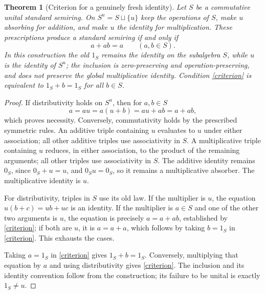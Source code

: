 \documentclass[11pt]{article}
\newtheorem{theorem}{Theorem}
\begin{document}
\begin{theorem}[Criterion for a genuinely fresh identity]
Let $S$ be a commutative unital standard semiring. On $S^u=S\sqcup\{u\}$ keep the operations of $S$, make $u$ absorbing for addition, and make $u$ the identity for multiplication. These prescriptions produce a standard semiring if and only if
\begin{equation}\label{criterion}
a+ab=a\qquad(a,b\in S).
\end{equation}
In this construction the old $1_S$ remains the identity on the subalgebra $S$, while $u$ is the identity of $S^u$; the inclusion is zero-preserving and operation-preserving, and does not preserve the global multiplicative identity. Condition \eqref{criterion} is equivalent to $1_S+b=1_S$ for all $b\in S$.
\end{theorem}
\begin{proof}
If distributivity holds on $S^u$, then for $a,b\in S$
\[
a=a u=a(u+b)=a u+ab=a+ab,
\]
which proves necessity. Conversely, commutativity holds by the prescribed symmetric rules. An additive triple containing $u$ evaluates to $u$ under either association; all other additive triples use associativity in $S$. A multiplicative triple containing $u$ reduces, in either association, to the product of the remaining arguments; all other triples use associativity in $S$. The additive identity remains $0_S$, since $0_S+u=u$, and $0_Su=0_S$, so it remains a multiplicative absorber. The multiplicative identity is $u$.

For distributivity, triples in $S$ use its old law. If the multiplier is $u$, the equation $u(b+c)=ub+uc$ is an identity. If the multiplier is $a\in S$ and one of the other two arguments is $u$, the equation is precisely $a=a+ab$, established by \eqref{criterion}; if both are $u$, it is $a=a+a$, which follows by taking $b=1_S$ in \eqref{criterion}. This exhausts the cases.

Taking $a=1_S$ in \eqref{criterion} gives $1_S+b=1_S$. Conversely, multiplying that equation by $a$ and using distributivity gives \eqref{criterion}. The inclusion and its identity convention follow from the construction; its failure to be unital is exactly $1_S\ne u$.
\end{proof}
\end{document}
